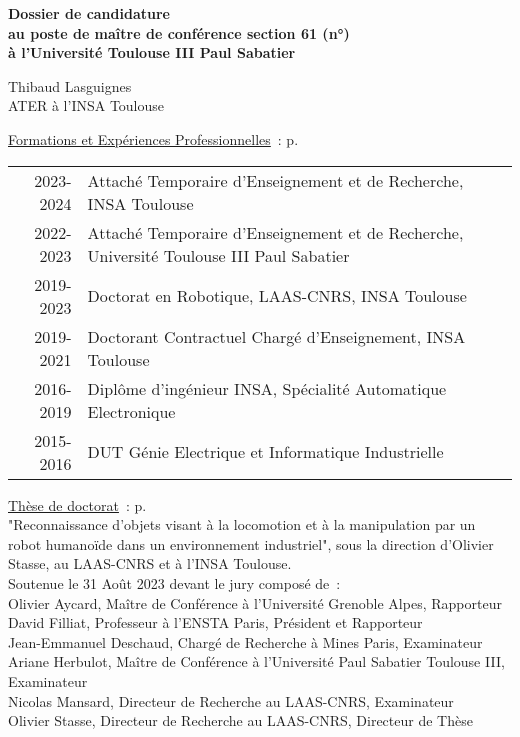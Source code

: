 \begin{center}
  \LARGE\bfseries
    Dossier de candidature\\
    au poste de maître de conférence section 61 (n°\numeroposteMCF)\\
    à l'Université Toulouse III Paul Sabatier
\end{center}
\begin{center}
  \LARGE
    Thibaud Lasguignes\\
    ATER à l'INSA Toulouse
\end{center}

\vspace{.08in}

\underline{Formations et Expériences Professionnelles}~: p.~\pageref{formations}\\
\begin{tabular}{@{\hskip .2in}r@{\hskip .2in}l}
  2023-2024 & Attaché Temporaire d'Enseignement et de Recherche, INSA Toulouse\\
  2022-2023 & Attaché Temporaire d'Enseignement et de Recherche, Université Toulouse III Paul Sabatier\\
  2019-2023 & Doctorat en Robotique, LAAS-CNRS, INSA Toulouse\\
  2019-2021 & Doctorant Contractuel Chargé d'Enseignement, INSA Toulouse\\
  2016-2019 & Diplôme d'ingénieur INSA, Spécialité Automatique Electronique\\
  2015-2016 & DUT Génie Electrique et Informatique Industrielle
\end{tabular}

\vspace{.08in}

\underline{Thèse de doctorat}~: p.~\pageref{these}\\
\hspace*{.2in}"Reconnaissance d'objets visant \`a la locomotion et \`a la manipulation par un robot humano\"ide dans un environnement industriel", sous la direction d'Olivier Stasse, au LAAS-CNRS et à l'INSA Toulouse.\\
Soutenue le 31 Ao\^ut 2023 devant le jury compos\'e de~:\\
\hspace*{.2in}Olivier Aycard, Ma\^itre de Conf\'erence à l'Universit\'e Grenoble Alpes, Rapporteur\\
\hspace*{.2in}David Filliat, Professeur à l'ENSTA Paris, Pr\'esident et Rapporteur\\
\hspace*{.2in}Jean-Emmanuel Deschaud, Charg\'e de Recherche à Mines Paris, Examinateur\\
\hspace*{.2in}Ariane Herbulot, Ma\^itre de Conf\'erence à l'Universit\'e Paul Sabatier Toulouse III, Examinateur\\
\hspace*{.2in}Nicolas Mansard, Directeur de Recherche au LAAS-CNRS, Examinateur\\
\hspace*{.2in}Olivier Stasse, Directeur de Recherche au LAAS-CNRS, Directeur de Th\`ese

